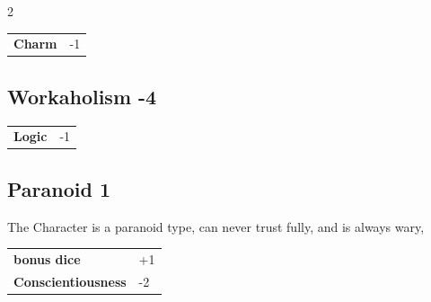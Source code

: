\begin{multicols}{2}
\begin{tcolorbox}
\vspace{3mm}

\begin{tabular}{@{}ll@{}}
    \textbf{Charm} & -1\\
\end{tabular}


\end{tcolorbox}

\begin{tcolorbox}
    \subsection*{Workaholism \hfill \small{-4 }}
    \tcblower




\begin{tabular}{@{}ll@{}}
    \textbf{Logic} & -1\\
\end{tabular}


\end{tcolorbox}

\begin{tcolorbox}
    \subsection*{Paranoid \hfill \small{1 }}
    \tcblower
The Character is a paranoid type, can never trust fully, and is always wary,


\vspace{3mm}

\begin{tabular}{@{}ll@{}}
    \textbf{bonus dice} & +1\\
    \textbf{Conscientiousness} & -2\\
\end{tabular}


\end{tcolorbox}


\end{multicols}

